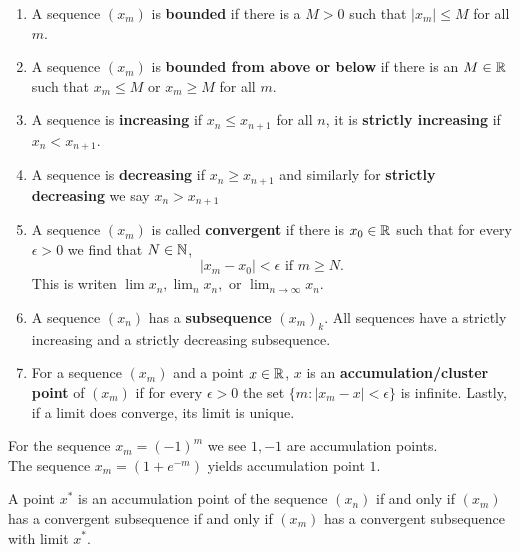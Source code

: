 \begin{definition}
	\begin{enumerate}
		\item A sequence \(\left( x_{m} \right) \) is \textbf{bounded} if there is a \(M >0 \) such that \(\left| x_{m} \right|  \le M\) for all \(m\).
		\item A sequence \(\left( x_{m} \right) \) is \textbf{bounded from above or below} if there is an \( M \in \mathbb{R}\) such that \(x_{m} \le M\) or \(x_{m} \ge M\) for all \(m\).
			\item A sequence is \textbf{increasing} if \(x_{n} \le x_{n+1}\) for all \(n\), it is \textbf{strictly increasing} if \(x_{n} < x_{n+1}\).
				\item A sequence is \textbf{decreasing} if \(x_{n} \ge x_{n+1}\) and similarly for \textbf{strictly decreasing} we say \(x_{n} > x_{n+1}\)
				\item A sequence \(\left( x_{m} \right) \) is called \textbf{convergent} if there is \(x_0 \in \mathbb{R}\) such that for every \( \epsilon > 0\) we find that \(N \in \mathbb{N}\), \[
				\left| x_{m} - x_0 \right| < \epsilon  \text{ if } m\ge N
				.\] This is writen \(\lim x_{n}, \lim_{n} x_{n}, \text{ or } \lim_{n \to \infty} x_{n}\).
			\item A sequence \(\left( x_{n} \right) \) has a \textbf{subsequence} \(\left( x_{m} \right)_{k} \). All sequences have a strictly increasing and a strictly decreasing subsequence.
			\item For a sequence \(\left( x_{m} \right) \)  and a point \(x \in \mathbb{R}\), \(x\) is an \textbf{accumulation/cluster point} of \(\left( x_{m} \right) \) if for every \(\epsilon > 0\) the set \(\{m : \left| x_{m} - x \right| < \epsilon\} \) is infinite. Lastly, if a limit does converge, its limit is unique.

	\end{enumerate}
	\begin{example}
		For the sequence \(x_{m}  = \left( -1 \right) ^{m}\) we see \(1, -1\) are accumulation points.\\
		The sequence \(x_{m} = \left( 1 + e^{-m} \right) \) yields accumulation point \(1\).
	\end{example}
\end{definition}
\begin{proposition}
	A point \(x^{*}\) is an accumulation point of the sequence \(\left( x_{n} \right) \) if and only if \(\left( x_{m} \right) \) has a convergent subsequence if and only if \(\left( x_{m} \right) \) has a convergent subsequence with limit \(x^{*}\).
\end{proposition}
